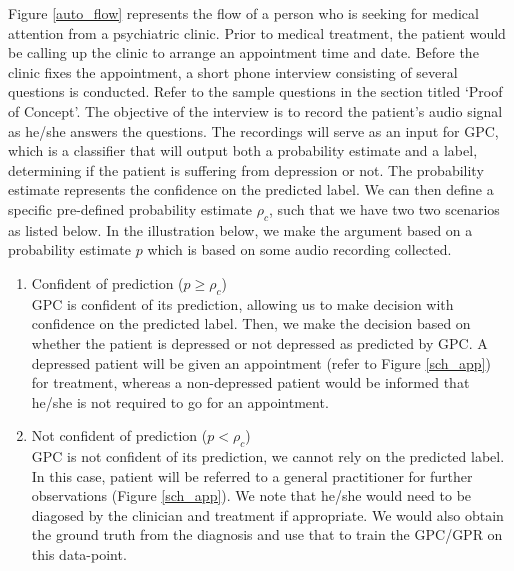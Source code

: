 \documentclass{article}
\begin{document}
Figure \ref{auto_flow} represents the flow of a person who is seeking for medical attention from a psychiatric clinic.
    Prior to medical treatment, the patient would be calling up the clinic to arrange an appointment time and date. 
    Before the clinic fixes the appointment, a short phone interview consisting of several questions is conducted.
    Refer to the sample questions in the section titled `Proof of Concept'.
    The objective of the interview is to record the patient's audio signal as he/she answers the questions.
    The recordings will serve as an input for GPC, which is a classifier that will output both a probability estimate and a label, determining if the patient is suffering from depression or not.
    The probability estimate represents the confidence on the predicted label. 
    We can then define a specific pre-defined probability estimate $\rho_c$, such that we have two two scenarios as listed below. 
    In the illustration below, we make the argument based on a probability estimate $p$ which is based on some audio recording collected.
	
	\begin{enumerate}
		\item {Confident of prediction ($p \geq \rho_c$)} \\
		GPC is confident of its prediction, allowing us to make decision with confidence on the predicted label.
		Then, we make the decision based on whether the patient is depressed or not depressed as predicted by GPC. 
		A depressed patient will be given an appointment (refer to Figure \ref{sch_app}) for treatment, whereas a non-depressed patient would be informed that he/she is not required to go for an appointment.
		\item {Not confident of prediction ($p < \rho_c$}) \\
		GPC is not confident of its prediction, we cannot rely on the predicted label. 
		In this case, patient will be referred to a general practitioner for further observations (Figure \ref{sch_app}). 
		We note that he/she would need to be diagosed by the clinician and treatment if appropriate. 
		We would also obtain the ground truth from the diagnosis and use that to train the GPC/GPR on this data-point. 
	\end{enumerate}
	
\end{document}
